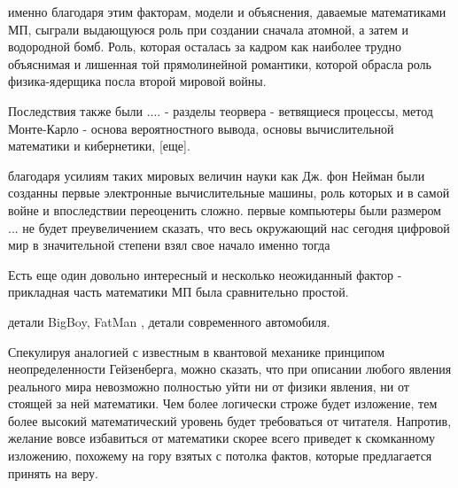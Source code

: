 именно благодаря этим факторам, модели и объяснения, даваемые математиками МП, сыграли выдающуюся роль при создании сначала атомной, а затем и водородной бомб. 
Роль, которая осталась за кадром как наиболее трудно объяснимая и лишенная той прямолинейной романтики, которой обрасла роль физика-ядерщика посла второй мировой войны.

Последствия также были .... - разделы теорвера - ветвящиеся процессы, метод Монте-Карло - основа вероятностного вывода, основы вычислительной математики и кибернетики, [еще].

благодаря усилиям таких мировых величин науки как Дж. фон Нейман были созданны первые электронные вычислительные машины, роль которых и в самой войне и впоследствии переоценить сложно.
первые компьютеры были размером ...
не будет преувеличением сказать, что весь окружающий нас сегодня цифровой мир в значительной степени взял свое начало именно тогда
  
Есть еще один довольно интересный и несколько неожиданный фактор - прикладная часть математики МП была сравнительно простой. 

детали BigBoy, FatMan , детали современного автомобиля.


Спекулируя аналогией с известным в квантовой механике принципом неопределенности Гейзенберга, можно сказать, что при описании любого явления реального мира невозможно полностью уйти ни от физики явления, ни от стоящей за ней математики.
Чем более логически строже будет изложение, тем более высокий математический уровень будет требоваться от читателя.
Напротив, желание вовсе избавиться от математики скорее всего приведет к скомканному изложению, похожему на гору взятых с потолка фактов, которые предлагается принять на веру.

